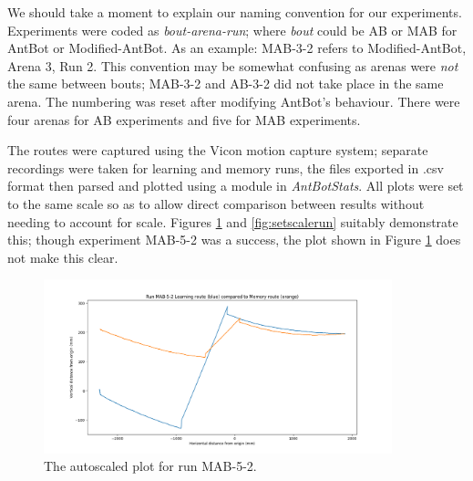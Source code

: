 \documentclass[a4paper,11pt,twoside,openright]{article}
\begin{document}
We should take a moment to explain our naming convention for our experiments. Experiments were coded as \textit{bout-arena-run}; where \textit{bout} could be
AB or MAB for AntBot or Modified-AntBot. As an example: MAB-3-2 refers to Modified-AntBot, Arena 3, Run 2. This convention may
be somewhat confusing as arenas were \textit{not} the same between bouts; MAB-3-2 and AB-3-2 did not take place in the same arena. The
numbering was reset after modifying AntBot's behaviour. There were four arenas for AB experiments and five for MAB experiments.
\newline

The routes were captured using the Vicon motion capture system; separate recordings were taken for learning and memory runs, the
files exported in .csv format then parsed and plotted using a module in \textit{AntBotStats}. All plots were set to the same scale
so as to allow direct comparison between results without needing to account for scale. Figures \ref{fig:autoscalerun} and \ref{fig:setscalerun}
suitably demonstrate this; though experiment MAB-5-2 was a success, the plot shown in Figure \ref{fig:autoscalerun} does not make this clear.

\begin{figure}
  \centering
  \includegraphics[width=0.9\textwidth]{MAB-5-2-notscaled}
  \caption{
   \label{fig:autoscalerun}The autoscaled plot for run MAB-5-2.
  }
\end{figure}
\end{document}
